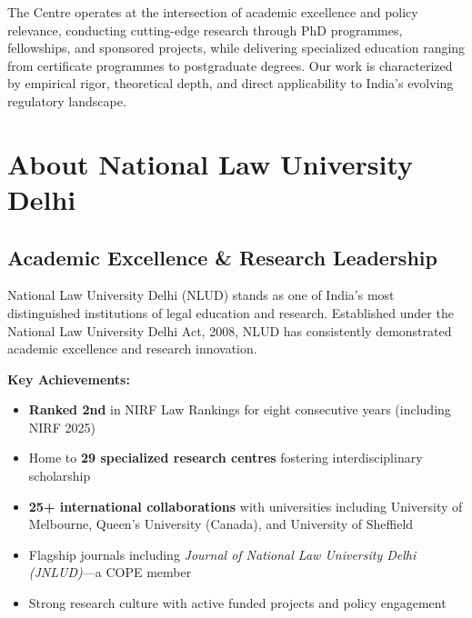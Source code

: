 \documentclass[11pt,a4paper]{article}
\begin{document}
\vspace{0.5cm}

\noindent The Centre operates at the intersection of academic excellence and policy relevance, conducting cutting-edge research through PhD programmes, fellowships, and sponsored projects, while delivering specialized education ranging from certificate programmes to postgraduate degrees. Our work is characterized by empirical rigor, theoretical depth, and direct applicability to India's evolving regulatory landscape.

\clearpage

\section{About National Law University Delhi}

\subsection*{Academic Excellence \& Research Leadership}

National Law University Delhi (NLUD) stands as one of India's most distinguished institutions of legal education and research. Established under the National Law University Delhi Act, 2008, NLUD has consistently demonstrated academic excellence and research innovation.

\vspace{0.3cm}

\begin{tcolorbox}[colback=goldthread!10,colframe=goldthread,arc=2mm]
\textbf{\headingfont Key Achievements:}
\begin{itemize}[leftmargin=*,noitemsep]
    \item \textbf{Ranked 2nd} in NIRF Law Rankings for eight consecutive years (including NIRF 2025)
    \item Home to \textbf{29 specialized research centres} fostering interdisciplinary scholarship
    \item \textbf{25+ international collaborations} with universities including University of Melbourne, Queen's University (Canada), and University of Sheffield
    \item Flagship journals including \textit{Journal of National Law University Delhi (JNLUD)}—a COPE member
    \item Strong research culture with active funded projects and policy engagement
\end{itemize}
\end{tcolorbox}
\end{document}

